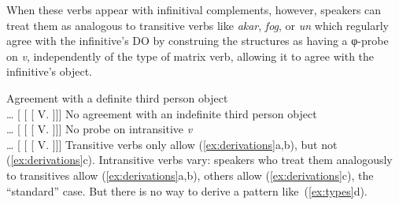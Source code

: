 When these verbs appear with infinitival complements, however, speakers can
treat them as analogous to transitive verbs like \emph{akar}, \emph{fog}, or
\emph{un} which regularly agree with the infinitive's \gls{DO} by construing
the structures as having a φ-probe on \emph{v}, independently of the type of
matrix verb, allowing it to agree with the infinitive's object.

\pex[interpartskip=6ex]\label{ex:derivations}
    \a  Agreement with a definite third person object\\
        \dots{} [  [ [ V.\Inf{}  ]]]
    \a  No agreement with an indefinite third person object\\
        \dots{} [  [ [ V.\Inf{}  ]]]
    \a  No probe on intransitive \emph{v}\\
        \dots{} [  [ [ V.\Inf{}  ]]]
\xe
Transitive verbs only allow (\ref{ex:derivations}a,b), but not
(\ref{ex:derivations}c). Intransitive verbs vary: speakers who treat them
analogously to transitives allow (\ref{ex:derivations}a,b), others allow
(\ref{ex:derivations}c), the \enquote{standard} case. But there is no way to
derive a pattern like~(\ref{ex:types}d).

%
%
%
%
%
%
%
%
%

